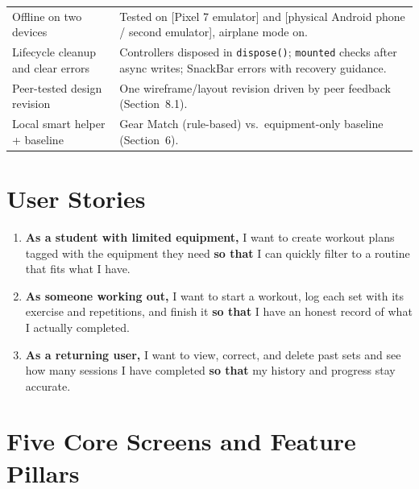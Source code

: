 \documentclass[11pt]{article}
\newcommand{\ph}[1]{\textcolor{ph}{[#1]}}
\begin{document}
\begin{tabularx}{\textwidth}{@{}P{4.6cm}L@{}}
Offline on two devices & Tested on \ph{Pixel 7 emulator} and \ph{physical Android phone / second emulator}, airplane mode on. \\
Lifecycle cleanup and clear errors & Controllers disposed in \texttt{dispose()}; \texttt{mounted} checks after async writes; SnackBar errors with recovery guidance. \\
Peer-tested design revision & One wireframe/layout revision driven by peer feedback (Section~8.1). \\
Local smart helper + baseline & Gear Match (rule-based) vs.\ equipment-only baseline (Section~6). \\
\bottomrule
\end{tabularx}

\section{User Stories}
\begin{enumerate}
  \item \textbf{As a student with limited equipment,} I want to create workout plans tagged with the equipment they need \textbf{so that} I can quickly filter to a routine that fits what I have.
  \item \textbf{As someone working out,} I want to start a workout, log each set with its exercise and repetitions, and finish it \textbf{so that} I have an honest record of what I actually completed.
  \item \textbf{As a returning user,} I want to view, correct, and delete past sets and see how many sessions I have completed \textbf{so that} my history and progress stay accurate.
\end{enumerate}

\section{Five Core Screens and Feature Pillars}
\end{document}
